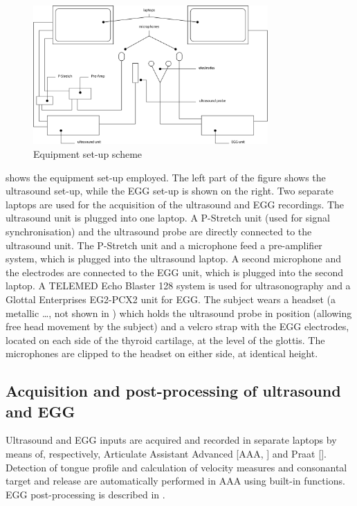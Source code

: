 \documentclass[11pt,A4paper,]{article}
\begin{document}
\begin{figure}[htbp]
\centering
\includegraphics[width=0.80000\textwidth]{../graphics/setup.png}
\caption{Equipment set-up scheme\label{f:setup}}
\end{figure}

 shows the equipment set-up employed. The left part of the
figure shows the ultrasound set-up, while the EGG set-up is shown on the
right. Two separate laptops are used for the acquisition of the
ultrasound and EGG recordings. The ultrasound unit is plugged into one
laptop. A P-Stretch unit (used for signal synchronisation) and the
ultrasound probe are directly connected to the ultrasound unit. The
P-Stretch unit and a microphone feed a pre-amplifier system, which is
plugged into the ultrasound laptop. A second microphone and the
electrodes are connected to the EGG unit, which is plugged into the
second laptop. A TELEMED Echo Blaster 128 system is used for
ultrasonography and a Glottal Enterprises EG2-PCX2 unit for EGG. The
subject wears a headset (a metallic \ldots{}, not shown in
) which holds the ultrasound probe in position (allowing
free head movement by the subject) and a velcro strap with the EGG
electrodes, located on each side of the thyroid cartilage, at the level
of the glottis. The microphones are clipped to the headset on either
side, at identical height.

\subsection{Acquisition and post-processing of ultrasound and
EGG}\label{acquisition-and-post-processing-of-ultrasound-and-egg}

Ultrasound and EGG inputs are acquired and recorded in separate laptops
by means of, respectively, Articulate Assistant Advanced {[}AAA, {]} and
Praat {[}{]}. Detection of tongue profile and calculation of velocity
measures and consonantal target and release are automatically performed
in AAA using built-in functions. EGG post-processing is described in
.
\end{document}
